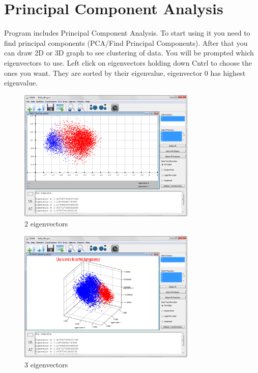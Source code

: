 \documentclass[a4paper,12pt,english]{report}
\begin{document}
\section*{Principal Component Analysis}
Program includes Principal Component Analysis. To start using it you need to find principal components (PCA/Find Principal Components). After that you can draw 2D or 3D graph to see clustering of data. You will be prompted which eigenvectors to use. Left click on eigenvectors holding down Cntrl to choose the ones you want. They are sorted by their eigenvalue, eigenvector 0 has highest eigenvalue.

\begin{figure}[htb]
\centering
\includegraphics[width=240pt]{s15.png}
\caption{2 eigenvectors}
\end{figure}

\begin{figure}[htb]
\centering
\includegraphics[width=240pt]{s16.png}
\caption{3 eigenvectors}
\end{figure}
\end{document}
